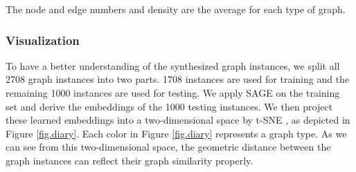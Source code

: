 \documentclass[sigconf]{acmart}
\begin{document}
\begin{table}
  \caption{Statistics of generated graph instances}
  \label{tab:sgg}
\raggedright{The node and edge numbers and density are the average for each type of graph.}
\vspace{-0.3cm}
\end{table}



\subsubsection{Visualization}
To have a better understanding of the synthesized graph instances, we split all 2708 graph instances into two parts.  1708 instances are used for training and the remaining 1000 instances are used for testing.  We apply SAGE on the training set and derive the embeddings of the 1000 testing instances.  We then project these learned embeddings into a two-dimensional space by t-SNE \cite{maaten2008visualizing}, as depicted in Figure \ref{fig.diary}. Each color in Figure \ref{fig.diary} represents a graph type.  As we can see from this two-dimensional space, the geometric distance between the graph instances can reflect their graph similarity properly.
\end{document}
